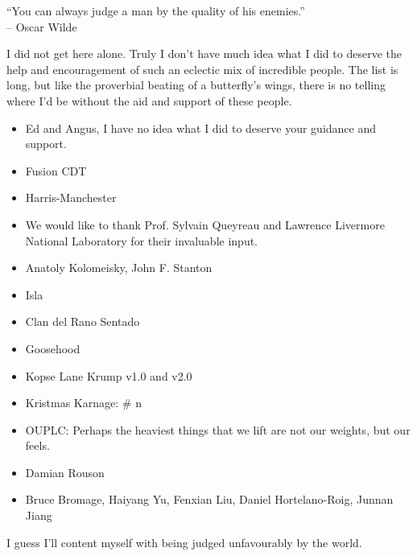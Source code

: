 \begin{frontmatter}[Acknowledgements]
    \centering
    ``You can always judge a man by the quality of his enemies.''\\
    -- Oscar Wilde

    \justify
    I did not get here alone. Truly I don't have much idea what I did to deserve the help and encouragement of such an eclectic mix of incredible people. The list is long, but like the proverbial beating of a butterfly's wings, there is no telling where I'd be without the aid and support of these people.

    \begin{itemize}
        \item Ed and Angus, I have no idea what I did to deserve your guidance and support.
        \item Fusion CDT
        \item Harris-Manchester
        \item We would like to thank Prof. Sylvain Queyreau and Lawrence Livermore National Laboratory for their invaluable input.
        \item Anatoly Kolomeisky, John F. Stanton
        \item Isla
        \item Clan del Rano Sentado
        \item Goosehood
        \item Kopse Lane Krump v1.0 and v2.0
        \item Kristmas Karnage: \# n
        \item OUPLC: Perhaps the heaviest things that we lift are not our weights, but our feels.
        \item Damian Rouson
        \item Bruce Bromage, Haiyang Yu, Fenxian Liu, Daniel Hortelano-Roig, Junnan Jiang
    \end{itemize}

    I guess I'll content myself with being judged unfavourably by the world.
\end{frontmatter}
